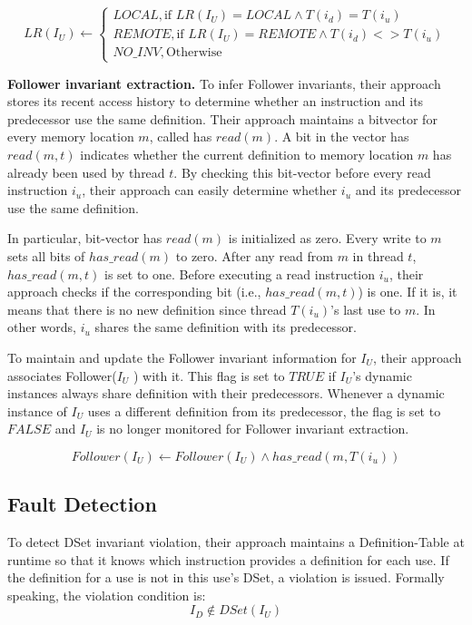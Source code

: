 \[
LR(I_U) \leftarrow 
\begin{cases}
LOCAL, \text{if } LR(I_U) = LOCAL \wedge T(i_d) = T(i_u)\\
REMOTE, \text{if } LR(I_U) = REMOTE \wedge T(i_d) <> T(i_u)\\
NO\_INV, \text{Otherwise } 
\end{cases}
\]

\textbf{Follower invariant extraction.} To infer Follower invariants, their approach stores its recent access history to determine whether an instruction and its predecessor use the same definition. Their approach maintains a bitvector for every memory location $m$, called has $read(m)$. A bit in the vector has $read(m,t)$ indicates whether the current definition to memory location $m$ has already been used by thread $t$. By checking this bit-vector before every read instruction $i_u$, their approach can easily determine whether $i_u$
and its predecessor use the same definition.

In particular, bit-vector has $read(m)$ is initialized as zero. Every write to $m$ sets all bits of $has\_read(m)$ to zero. After any read from $m$ in thread $t$, $has\_read(m, t)$ is set to one. Before executing a read instruction $i_u$, their approach checks if the corresponding bit (i.e., $has\_read(m,t)$) is one. If it is, it means that there is no new definition since thread $T(i_u)$'s last use to $m$. In other words, $i_u$ shares
the same definition with its predecessor.

To maintain and update the Follower invariant information for $I_U$, their approach associates Follower($I_U$ ) with it. This flag is set to $TRUE$ if $I_U$'s dynamic instances always share definition with their predecessors. Whenever a dynamic instance of $I_U$ uses a different definition from its predecessor, the flag is set to $FALSE$ and $I_U$ is no longer monitored for Follower invariant extraction.

$$ Follower(I_U) \leftarrow Follower(I_U) \wedge has\_read(m,T(i_u))$$


\subsection{Fault Detection}
To detect DSet invariant violation, their approach maintains a Definition-Table at runtime so that it knows which instruction provides a definition for each use. If the definition for a use is not in this use's DSet, a violation is issued. Formally speaking, the violation condition is:
$$I_D \notin DSet(I_U)$$

